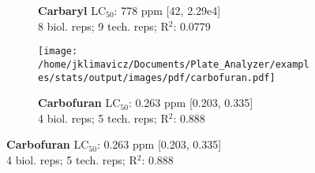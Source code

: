 \documentclass{article}
\begin{document}
\begin{figure}[thp!]
\begin{subfigure}{0.500\textwidth}
      \vspace{-0.05cm}
      \caption*{\textbf{Carbaryl} LC$_{50}$: 778 ppm [42, 2.29e4] \\ 
8 biol. reps; 9 tech. reps; R$^2$: 0.0779}
      \vspace{0.1cm}
   \end{subfigure}%
   \begin{subfigure}{0.500\textwidth}
      \centering
      \texttt{[image: /home/jklimavicz/Documents/Plate\_Analyzer/examples/stats/output/images/pdf/carbofuran.pdf]}
      \vspace{-0.05cm}
      \caption*{\textbf{Carbofuran} LC$_{50}$: 0.263 ppm [0.203, 0.335] \\ 
4 biol. reps; 5 tech. reps; R$^2$: 0.888}
      \vspace{0.1cm}
   \end{subfigure}%
\end{figure}
\clearpage
\pagebreak
\vspace{-0.1cm}
\end{document}
